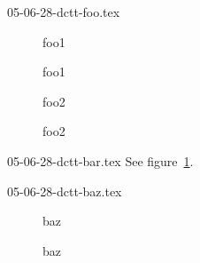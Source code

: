 \begin{filecontents}{05-06-28-dctt-foo.tex}
\begin{figure}
  foo1
  \caption{foo1}\label{fig:foo1}
\end{figure}

\begin{figure}\ContinuedFloat
  foo2
  \caption{foo2}\label{fig:foo2}
\end{figure}
\end{filecontents}

\begin{filecontents}{05-06-28-dctt-bar.tex}
See figure~\ref{fig:foo1}.
\end{filecontents}

\begin{filecontents}{05-06-28-dctt-baz.tex}
\begin{figure}
  baz
  \caption{baz}\label{fig:baz}
\end{figure}
\end{filecontents}

\documentclass{article}
\usepackage{caption}[2005/06/22]
\usepackage{hyperref}
%





